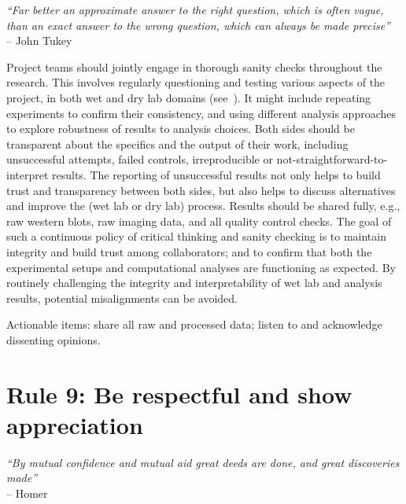 \documentclass{article}
\begin{document}
\begin{flushright}
\rightskip=1cm\textit{``Far better an approximate answer to the right question, which is often vague, than an exact answer to the wrong question, which can always be made precise''} \\
\vspace{.2em}
\rightskip=0cm -- John Tukey
\end{flushright}

Project teams should jointly engage in thorough sanity checks throughout the research. This involves regularly questioning and testing various aspects of the project, in both wet and dry lab domains (see~). It might include repeating experiments to confirm their consistency, and using different analysis approaches to explore robustness of results to analysis choices. Both sides should be transparent about the specifics and the output of their work, including unsuccessful attempts, failed controls, irreproducible or not-straightforward-to-interpret results. The reporting of unsuccessful results not only helps to build trust and transparency between both sides, but also helps to discuss alternatives and improve the (wet lab or dry lab) process. Results should be shared fully, e.g., raw western blots, raw imaging data, and all quality control checks. The goal of such a continuous policy of critical thinking and sanity checking is to maintain integrity and build trust among collaborators; and to confirm that both the experimental setups and computational analyses are functioning as expected. By routinely challenging the integrity and interpretability of wet lab and analysis results, potential misalignments can be avoided.

Actionable items: share all raw and processed data; listen to and acknowledge dissenting opinions.

\section*{Rule 9: Be respectful and show appreciation} %
\label{rule9_respect}

\begin{flushright}
\rightskip=1cm\textit{``By mutual confidence and mutual aid great deeds are done, and great discoveries made''} \\
\vspace{.2em}
\rightskip=0cm -- Homer
\end{flushright}
\end{document}
